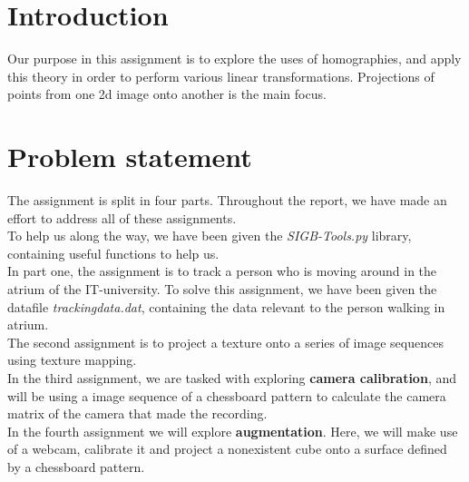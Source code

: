 \section{Introduction}
Our purpose in this assignment is to explore the uses of homographies, and apply this theory in order to perform various linear transformations. Projections of points from one 2d image onto another is the main focus.\newline

\section{Problem statement}

The assignment is split in four parts. Throughout the report, we have made an effort to address all of these assignments.\\

To help us along the way, we have been given the \textsl{SIGB-Tools.py} library, containing useful functions to help us.\\

In part one, the assignment is to track a person who is moving around in the atrium of the IT-university. To solve this assignment, we have been given the datafile \textsl{trackingdata.dat}, containing the data relevant to the person walking in atrium.\\

The second assignment is to project a texture onto a series of image sequences using texture mapping.\\

In the third assignment, we are tasked with exploring \textbf{camera calibration}, and will be using a image sequence of a chessboard pattern to calculate the camera matrix of the camera that made the recording.\\

In the fourth assignment we will explore \textbf{augmentation}. Here, we will make use of a webcam, calibrate it and project a nonexistent cube onto a surface defined by a chessboard pattern.
\newpage